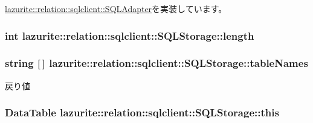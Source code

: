 \hyperlink{interfacelazurite_1_1relation_1_1sqlclient_1_1_s_q_l_adapter_ab3bcdebb8e41b05a006fde8ce751af03}{lazurite::relation::sqlclient::SQLAdapter}を実装しています。\hypertarget{classlazurite_1_1relation_1_1sqlclient_1_1_s_q_l_storage_a545b620205815ab5d91fddf3910eed88}{
\subsubsection[{length}]{\setlength{\rightskip}{0pt plus 5cm}int lazurite::relation::sqlclient::SQLStorage::length}}
\label{classlazurite_1_1relation_1_1sqlclient_1_1_s_q_l_storage_a545b620205815ab5d91fddf3910eed88}
\hypertarget{classlazurite_1_1relation_1_1sqlclient_1_1_s_q_l_storage_a6a10ad962b51ba757b4664e397a8e31d}{
\subsubsection[{tableNames}]{\setlength{\rightskip}{0pt plus 5cm}string \mbox{[}$\,$\mbox{]} lazurite::relation::sqlclient::SQLStorage::tableNames}}
\label{classlazurite_1_1relation_1_1sqlclient_1_1_s_q_l_storage_a6a10ad962b51ba757b4664e397a8e31d}
\begin{DoxyReturn}{戻り値}

\end{DoxyReturn}
\hypertarget{classlazurite_1_1relation_1_1sqlclient_1_1_s_q_l_storage_acee858e25cf0ef20c657b89842fa9730}{
\subsubsection[{this}]{\setlength{\rightskip}{0pt plus 5cm}DataTable lazurite::relation::sqlclient::SQLStorage::this}}
\label{classlazurite_1_1relation_1_1sqlclient_1_1_s_q_l_storage_acee858e25cf0ef20c657b89842fa9730}


